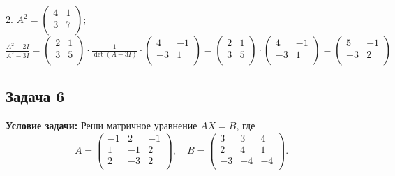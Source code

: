\documentclass[a4paper,12pt]{article}
\begin{document}
 2.
$A^2 =
\begin{pmatrix}
4 & 1 \\
3 & 7 \\
\end{pmatrix}$;
$\frac{A^2 - 2I}{A^2 - 3I}=
\begin{pmatrix}
2 & 1 \\
3 & 5 \\
\end{pmatrix}\cdot \frac{1}{\det{(A-3I)}}\cdot 
\begin{pmatrix}
4 & -1 \\
-3 & 1 \\
\end{pmatrix}=\begin{pmatrix}
2 & 1 \\
3 & 5 \\
\end{pmatrix}\cdot \begin{pmatrix}
4 & -1 \\
-3 & 1 \\
\end{pmatrix}=
\begin{pmatrix}
5 & -1 \\
-3 & 2 \\
\end{pmatrix}
$
\subsection{Задача 6}
\textbf{Условие задачи:}
Реши матричное уравнение $AX = B$, где
\[
A = 
\begin{pmatrix}
-1 & 2 & -1 \\
1 & -1 & 2 \\
2 & -3 & 2 \\
\end{pmatrix}, \quad B = 
\begin{pmatrix}
3 & 3 & 4 \\
2 & 4 & 1 \\
-3 & -4 & -4 \\
\end{pmatrix}.
\]
\end{document}
